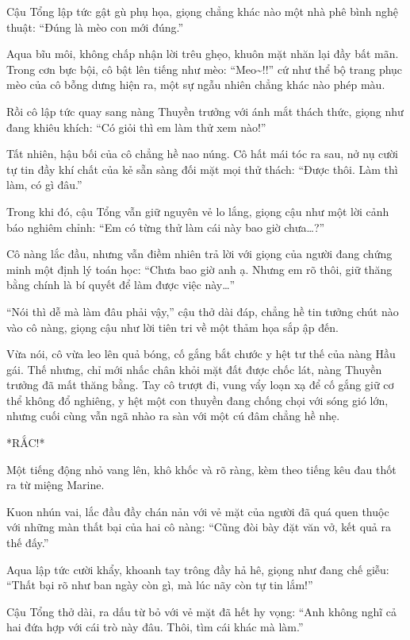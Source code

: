 \documentclass[../main.tex]{subfiles}
\begin{document}
Cậu Tổng lập tức gật gù phụ họa, giọng chẳng khác nào một nhà phê bình nghệ thuật: ``Đúng là mèo con mới đúng.''

Aqua bĩu môi, không chấp nhận lời trêu ghẹo, khuôn mặt nhăn lại đầy bất mãn. Trong cơn bực bội, cô bật lên tiếng như mèo: ``Meo\~{}!!'' cứ như thể bộ trang phục mèo của cô bỗng dưng hiện ra, một sự ngẫu nhiên chẳng khác nào phép màu.


Rồi cô lập tức quay sang nàng Thuyền trưởng với ánh mắt thách thức, giọng như đang khiêu khích: ``Có giỏi thì em làm thử xem nào!''

Tất nhiên, hậu bối của cô chẳng hề nao núng. Cô hất mái tóc ra sau, nở nụ cười tự tin đầy khí chất của kẻ sẵn sàng đối mặt mọi thử thách: ``Được thôi. Làm thì làm, có gì đâu.''

Trong khi đó, cậu Tổng vẫn giữ nguyên vẻ lo lắng, giọng cậu như một lời cảnh báo nghiêm chỉnh: ``Em có từng thử làm cái này bao giờ chưa\dots?''

Cô nàng lắc đầu, nhưng vẫn điềm nhiên trả lời với giọng của người đang chứng minh một định lý toán học: ``Chưa bao giờ anh ạ. Nhưng em rõ thôi, giữ thăng bằng chính là bí quyết để làm được việc này\dots''

``Nói thì dễ mà làm đâu phải vậy,'' cậu thở dài đáp, chẳng hề tin tưởng chút nào vào cô nàng, giọng cậu như lời tiên tri về một thảm họa sắp ập đến.

Vừa nói, cô vừa leo lên quả bóng, cố gắng bắt chước y hệt tư thế của nàng Hầu gái. Thế nhưng, chỉ mới nhấc chân khỏi mặt đất được chốc lát, nàng Thuyền trưởng đã mất thăng bằng. Tay cô trượt đi, vung vẩy loạn xạ để cố gắng giữ cơ thể không đổ nghiêng, y hệt một con thuyền đang chống chọi với sóng gió lớn, nhưng cuối cùng vẫn ngã nhào ra sàn với một cú đâm chẳng hề nhẹ.

*RẮC!*

Một tiếng động nhỏ vang lên, khô khốc và rõ ràng, kèm theo tiếng kêu đau thốt ra từ miệng Marine.


Kuon nhún vai, lắc đầu đầy chán nản với vẻ mặt của người đã quá quen thuộc với những màn thất bại của hai cô nàng: ``Cũng đòi bày đặt văn vở, kết quả ra thế đấy.''

Aqua lập tức cười khẩy, khoanh tay trông đầy hả hê, giọng như đang chế giễu: ``Thất bại rõ như ban ngày còn gì, mà lúc nãy còn tự tin lắm!''

Cậu Tổng thở dài, ra dấu từ bỏ với vẻ mặt đã hết hy vọng: ``Anh không nghĩ cả hai đứa hợp với cái trò này đâu. Thôi, tìm cái khác mà làm.''
\end{document}
